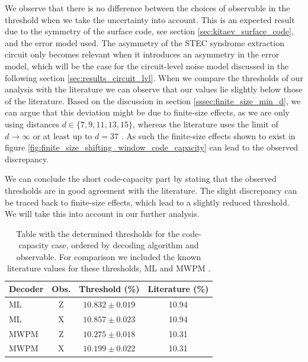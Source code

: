 We observe that there is no difference between the choices of observable in the threshold when we take the uncertainty into account.
This is an expected result due to the symmetry of the surface code, see section \ref{sec:kitaev_surface_code}, and the error model used.
The asymmetry of the STEC syndrome extraction circuit only becomes relevant when it introduces an asymmetry in the error model, 
which will be the case for the circuit-level noise model discussed in the following section \ref{sec:results_circuit_lvl}.
When we compare the thresholds of our analysis with the literature we can observe that our values lie slightly below those of the literature. 
Based on the discussion in section \ref{sssec:finite_size_min_d}, we can argue that this deviation might be due to finite-size effects, 
as we are only using distances $d\in \{ 7,9,11,13,15\}$, whereas the literature uses the limit of $d\rightarrow \infty$ \cite{topological_quantum_memory,ml_threshold_paper} or at least up to $d=37$ \cite{mwpm_threshold_paper}.
As such the finite-size effects shown to exist in figure \ref{fig:finite_size_shifting_window_code_capacity} can lead to the observed discrepancy.

We can conclude the short code-capacity part by stating that the observed thresholds are in good agreement with the literature.
The slight discrepancy can be traced back to finite-size effects, which lead to a slightly reduced threshold.
We will take this into account in our further analysis. 

\begin{table}[ht]
    \centering
    \begin{tabular}{lccc}
        \hline
        Decoder & Obs. & Threshold (\%) & Literature (\%) \\
        \hline
        ML   & Z & $10.832 \pm 0.019$ & 10.94 \\
        ML   & X & $10.857 \pm 0.023$ & 10.94 \\
        MWPM & Z & $10.275 \pm 0.018$ & 10.31 \\
        MWPM & X & $10.199 \pm 0.022$ & 10.31 \\
        \hline
    \end{tabular} 
    \caption{
        Table with the determined thresholds for the code-capacity case, ordered by decoding algorithm and observable.
        For comparison we included the known literature values for these thresholds, ML \cite{topological_quantum_memory,ml_threshold_paper} and MWPM \cite{efficient_decoding_algorithm,mwpm_threshold_paper}.
        }
    \label{tab:results_code_capacity}
\end{table}


